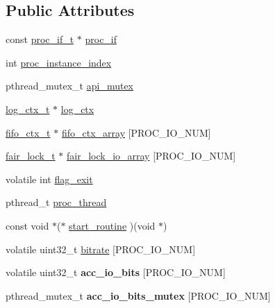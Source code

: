 \subsection*{Public Attributes}
\begin{DoxyCompactItemize}
\item 
const \hyperlink{proc_8h_a679816cf30e0b7a8f3e7464e67a6a844}{proc\+\_\+if\+\_\+t} $\ast$ \hyperlink{structproc__ctx__s_ae63f720fef21f807ed42fe76806140f6}{proc\+\_\+if}
\item 
int \hyperlink{structproc__ctx__s_a3912d4b5eaffcdaefa00f149ca4a8c63}{proc\+\_\+instance\+\_\+index}
\item 
pthread\+\_\+mutex\+\_\+t \hyperlink{structproc__ctx__s_aea90c57d9b0a303b638a51ce7efa9a1e}{api\+\_\+mutex}
\item 
\hyperlink{structlog__ctx__s}{log\+\_\+ctx\+\_\+t} $\ast$ \hyperlink{structproc__ctx__s_a7c58dee78b4d7834e4c2fe430cd267d5}{log\+\_\+ctx}
\item 
\hyperlink{fifo_8c_acf3f21e64cbabccd8420c306740820c1}{fifo\+\_\+ctx\+\_\+t} $\ast$ \hyperlink{structproc__ctx__s_a3b71d039235f439a87d9ec7d7b5b5549}{fifo\+\_\+ctx\+\_\+array} \mbox{[}P\+R\+O\+C\+\_\+\+I\+O\+\_\+\+N\+UM\mbox{]}
\item 
\hyperlink{structfair__lock__s}{fair\+\_\+lock\+\_\+t} $\ast$ \hyperlink{structproc__ctx__s_a6529e1ba97566c429d658e121bb604bb}{fair\+\_\+lock\+\_\+io\+\_\+array} \mbox{[}P\+R\+O\+C\+\_\+\+I\+O\+\_\+\+N\+UM\mbox{]}
\item 
volatile int \hyperlink{structproc__ctx__s_a86a21b28f6c41f7a9a4cc9586f782d68}{flag\+\_\+exit}
\item 
pthread\+\_\+t \hyperlink{structproc__ctx__s_a09ad60355584215cfeb4d5589ee390b9}{proc\+\_\+thread}
\item 
const void $\ast$($\ast$ \hyperlink{structproc__ctx__s_a1149ce1c28aae8e553c85125e30be661}{start\+\_\+routine} )(void $\ast$)
\end{DoxyCompactItemize}
{\bf }\par
\begin{DoxyCompactItemize}
\item 
volatile uint32\+\_\+t \hyperlink{structproc__ctx__s_a31bad437eed5d81c08a01538416c3639}{bitrate} \mbox{[}P\+R\+O\+C\+\_\+\+I\+O\+\_\+\+N\+UM\mbox{]}
\item 
volatile uint32\+\_\+t {\bfseries acc\+\_\+io\+\_\+bits} \mbox{[}P\+R\+O\+C\+\_\+\+I\+O\+\_\+\+N\+UM\mbox{]}\hypertarget{structproc__ctx__s_a63e59dc7c4a361ca2b52e2354f51c33a}{}\label{structproc__ctx__s_a63e59dc7c4a361ca2b52e2354f51c33a}

\item 
pthread\+\_\+mutex\+\_\+t {\bfseries acc\+\_\+io\+\_\+bits\+\_\+mutex} \mbox{[}P\+R\+O\+C\+\_\+\+I\+O\+\_\+\+N\+UM\mbox{]}\hypertarget{structproc__ctx__s_a486d5806453d8171e298c449c6391c1d}{}\label{structproc__ctx__s_a486d5806453d8171e298c449c6391c1d}

\end{DoxyCompactItemize}

